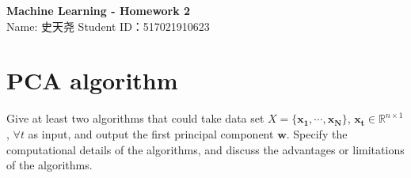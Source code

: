 \documentclass[12pt,a4paper,UTF8,fntef]{article}
\begin{document}
\begin{center}
\LARGE{\textbf{Machine Learning - Homework 2}}\vspace{1mm}\\
\footnotesize{Name: 史天尧 \qquad Student ID：517021910623}
\end{center}

\section{PCA algorithm}
Give at least two algorithms that could take data set $X=\{\mathbf{x_1},\cdots,\mathbf{x_N}\}$, $\mathbf{x_t} \in \mathbb{R}^{n\times1}$, $\forall t$ as input, and output the first principal component $\mathbf{w}$. Specify the computational details of the algorithms, and discuss the advantages or limitations of the algorithms.
\end{document}
